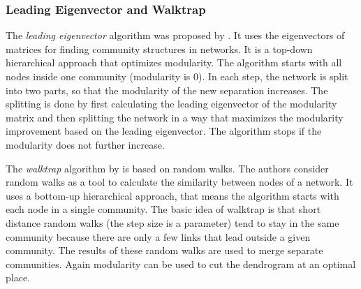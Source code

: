 \subsubsection{Leading Eigenvector and Walktrap}
The \emph{leading eigenvector} algorithm was proposed by \textcite{newman2006finding}.
It uses the eigenvectors of matrices for finding community structures in networks.
It is a top-down hierarchical approach that optimizes modularity.
The algorithm starts with all nodes inside one community (modularity is 0).
In each step, the network is split into two parts, so that the modularity of the new separation increases.
The splitting is done by first calculating the leading eigenvector of the modularity matrix and then splitting the network in a way that maximizes the modularity improvement based on the leading eigenvector.
The algorithm stops if the modularity does not further increase.

The \emph{walktrap} algorithm by \textcite{pons2005computing} is based on random walks.
The authors consider random walks as a tool to calculate the similarity between nodes of a network.
It uses a bottom-up hierarchical approach, that means the algorithm starts with each node in a single community.
The basic idea of walktrap is that short distance random walks (the step size is a parameter) tend to stay in the same community because there are only a few links that lead outside a given community.
The results of these random walks are used to merge separate communities.
Again modularity can be used to cut the dendrogram at an optimal place.